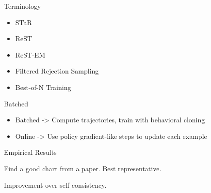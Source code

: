 \documentclass[14pt,aspectratio=169]{beamer}
\begin{document}
\begin{frame}{Terminology}
	\begin{itemize}
		\item STaR
		\item ReST
		\item ReST-EM
		\item Filtered Rejection Sampling
		\item Best-of-N Training
	\end{itemize}
\end{frame}


\begin{frame}{Batched }
	\begin{itemize}
		\item Batched -> Compute trajectories, train with behavioral cloning
		\item Online -> Use policy gradient-like steps to update each example
	\end{itemize}
\end{frame}





\begin{frame}{Empirical Results}

	Find a good chart from a paper.
	Best representative.

	Improvement over self-consistency.
\end{frame}
\end{document}
